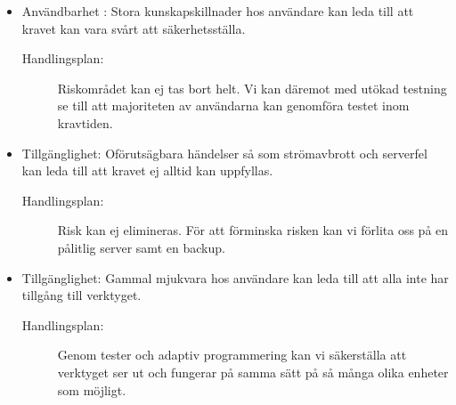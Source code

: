 \documentclass{article}
\begin{document}
\begin{itemize}
    \item Användbarhet : Stora kunskapskillnader hos användare kan leda till att kravet kan vara svårt att säkerhetsställa.
    \begin{description}
          \item[Handlingsplan:] Riskområdet kan ej tas bort helt. Vi kan däremot med utökad testning se till att majoriteten av användarna kan genomföra testet inom kravtiden.
    \end{description}
        \item Tillgänglighet: Oförutsägbara händelser så som strömavbrott och serverfel kan leda till att kravet ej alltid kan uppfyllas. 
        \begin{description}
          \item [Handlingsplan:] Risk kan ej elimineras. För att förminska risken kan vi förlita oss på en pålitlig server samt en backup.
    \end{description}
        \item Tillgänglighet: Gammal mjukvara hos användare kan leda till att alla inte har tillgång till verktyget.
        \begin{description}
          \item[Handlingsplan:] Genom tester och adaptiv programmering kan vi säkerställa att verktyget ser ut och fungerar på samma sätt på så många olika enheter som möjligt.
    \end{description}
   

\end{itemize}
\end{document}
